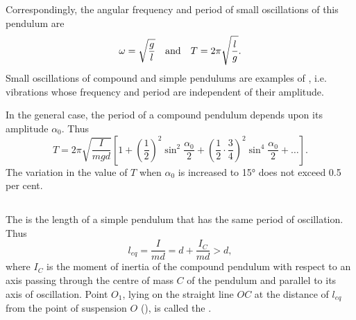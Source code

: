 Correspondingly, the angular frequency and period of small oscillations of this pendulum are
\begin{equation*}%
\omega = \sqrt{\frac{g}{l}} \qand T = 2 \pi \sqrt{\frac{l}{g}}.
\end{equation*}
Small oscillations of compound and simple pendulums are examples of , i.e. vibrations whose frequency and period are independent of their amplitude.

In the general case, the period of a compound pendulum depends upon its amplitude $\alpha_{0}$. Thus
\begin{equation*}%
T = 2\pi \sqrt{\frac{I}{mgd}} \left[ 1 + \left(\frac{1}{2} \right)^{2} \sin^{2} \frac{\alpha_{0}}{2} + \left(\frac{1}{2} \cdot \frac{3}{4} \right)^{2} \sin^{4} \frac{\alpha_{0}}{2} + \ldots{} \right].
\end{equation*}
The variation in the value of $T$ when $\alpha_{0}$ is increased to \ang{15} does not exceed 0.5 per cent.

\subsection{}\label{28.2.6} The  is the length of a simple pendulum that has the same period of oscillation. Thus 
\begin{equation*}%
l_{eq} = \frac{I}{md} = d + \frac{I_{C}}{md} > d,
\end{equation*}
where $I_{C}$ is the moment of inertia of the compound pendulum with respect to an axis passing through the centre of mass $C$ of the pendulum and parallel to its axis of oscillation. Point $O_{1}$, lying on the straight line $OC$ at the distance of $l_{eq}$ from the point of suspension $O$ (), is called the . 

